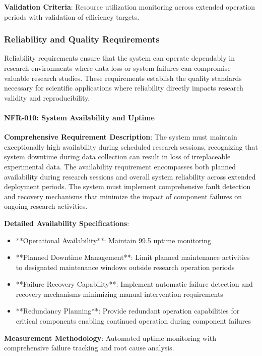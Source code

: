 \documentclass[12pt,a4paper]{report}
\begin{document}
\textbf{Validation Criteria}: Resource utilization monitoring across extended operation periods with validation of efficiency
targets.

\subsubsection{Reliability and Quality Requirements}

Reliability requirements ensure that the system can operate dependably in research environments where data loss or
system failures can compromise valuable research studies. These requirements establish the quality standards necessary
for scientific applications where reliability directly impacts research validity and reproducibility.

\paragraph{NFR-010: System Availability and Uptime}

\textbf{Comprehensive Requirement Description}: The system must maintain exceptionally high availability during scheduled
research sessions, recognizing that system downtime during data collection can result in loss of irreplaceable
experimental data. The availability requirement encompasses both planned availability during research sessions and
overall system reliability across extended deployment periods. The system must implement comprehensive fault detection
and recovery mechanisms that minimize the impact of component failures on ongoing research activities.

\textbf{Detailed Availability Specifications}:

\begin{itemize}
\item **Operational Availability**: Maintain 99.5%
  uptime monitoring
\item **Planned Downtime Management**: Limit planned maintenance activities to designated maintenance windows outside
  research operation periods
\item **Failure Recovery Capability**: Implement automatic failure detection and recovery mechanisms minimizing manual
  intervention requirements
\item **Redundancy Planning**: Provide redundant operation capabilities for critical components enabling continued operation
  during component failures

\end{itemize}
\textbf{Measurement Methodology}: Automated uptime monitoring with comprehensive failure tracking and root cause analysis.
\end{document}
